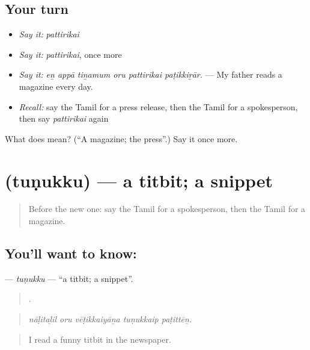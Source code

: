 \subsection*{Your turn}
\begin{itemize}
\raggedright
  \item \emph{Say it:} \emph{pattirikai}
  \item \emph{Say it:} \emph{pattirikai}, once more
  \item \emph{Say it:} \emph{eṉ appā tiṉamum oru pattirikai paṭikkiṟār.} — My father reads a magazine every day.
  \item \emph{Recall:} say the Tamil for a press release, then the Tamil for a spokesperson, then say \emph{pattirikai} again
\end{itemize}

\begin{tcolorbox}[breakable,colback=teal!4,colframe=teal!35!black,title={Before you move on}]
What does  mean? (\textquotedblleft{}A magazine; the press\textquotedblright{}.) Say it once more.
\end{tcolorbox}
\section[\texorpdfstring{\ta{துணுக்கு} (tuṇukku)}{துணுக்கு (tuṇukku)}]{ (tuṇukku) — a titbit; a snippet}

\label{lesson:TA-C307-tunukku}



\begin{quote}
Before the new one: say the Tamil for a spokesperson, then the Tamil for a magazine.
\end{quote}

\subsection*{You'll want to know: }
\textbf{} — \emph{tuṇukku} — \textquotedblleft{}a titbit; a snippet\textquotedblright{}.

\begin{quote}
    .
\end{quote}

\begin{quote}
\emph{nāḷitaḻil oru vēṭikkaiyāṉa tuṇukkaip paṭittēṉ.}
\end{quote}

\begin{quote}
I read a funny titbit in the newspaper.
\end{quote}

